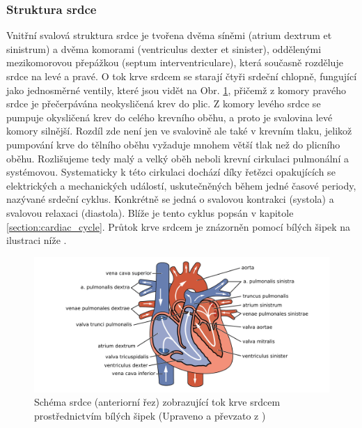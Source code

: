 \subsubsection{Struktura srdce}
\label{section:heart_structure}
Vnitřní svalová struktura srdce je tvořena dvěma síněmi (atrium dextrum et
sinistrum) a dvěma komorami (ventriculus dexter et sinister), oddělenými
mezikomorovou přepážkou (septum interventriculare), která současně rozděluje
srdce na levé a pravé. O tok krve srdcem se starají čtyři srdeční chlopně,
fungující jako jednosměrné ventily, které jsou vidět na Obr.
\ref{img:heartanatomy}, přičemž z komory pravého srdce je přečerpávána
neokysličená krev do plic. Z komory levého srdce se pumpuje okysličená krev do
celého krevního oběhu, a proto je svalovina levé komory silnější. Rozdíl zde není
jen ve svalovině ale také v krevním tlaku, jelikož pumpování krve do tělního
oběhu vyžaduje mnohem větší tlak než do plicního oběhu. Rozlišujeme tedy malý a
velký oběh neboli krevní cirkulaci pulmonální a systémovou. Systematicky k této
cirkulaci dochází díky řetězci opakujících se elektrických a mechanických
událostí, uskutečněných během jedné časové periody, nazývané srdeční cyklus.
Konkrétně se jedná o svalovou kontrakci (systola) a svalovou relaxaci
(diastola). Blíže je tento cyklus popsán v kapitole \ref{section:cardiac_cycle}.
Průtok krve srdcem je znázorněn pomocí bílých šipek na ilustraci níže
\cite{Memorix2017,Stejfa2006}.

\begin{figure}[h]
	\begin{center}
		\includegraphics[width=1\textwidth]{../assets/anatomy/heart}
		\caption{Schéma srdce (anteriorní řez) zobrazující tok krve srdcem
			prostřednictvím bílých šipek (Upraveno a převzato z
			\cite{OpenStax})}
		\label{img:heartanatomy}
	\end{center}
\end{figure}

